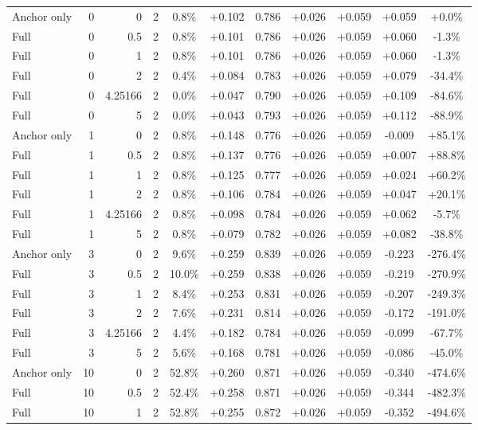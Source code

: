 \begin{table}[htbp]
\begin{tabular}{lrrrccccccc}
Anchor only & 0 & 0 & 2 & 0.8\% & +0.102 & 0.786 & +0.026 & +0.059 & +0.059 & +0.0\% \\
Full & 0 & 0.5 & 2 & 0.8\% & +0.101 & 0.786 & +0.026 & +0.059 & +0.060 & -1.3\% \\
Full & 0 & 1 & 2 & 0.8\% & +0.101 & 0.786 & +0.026 & +0.059 & +0.060 & -1.3\% \\
Full & 0 & 2 & 2 & 0.4\% & +0.084 & 0.783 & +0.026 & +0.059 & +0.079 & -34.4\% \\
Full & 0 & 4.25166 & 2 & 0.0\% & +0.047 & 0.790 & +0.026 & +0.059 & +0.109 & -84.6\% \\
Full & 0 & 5 & 2 & 0.0\% & +0.043 & 0.793 & +0.026 & +0.059 & +0.112 & -88.9\% \\
Anchor only & 1 & 0 & 2 & 0.8\% & +0.148 & 0.776 & +0.026 & +0.059 & -0.009 & +85.1\% \\
Full & 1 & 0.5 & 2 & 0.8\% & +0.137 & 0.776 & +0.026 & +0.059 & +0.007 & +88.8\% \\
Full & 1 & 1 & 2 & 0.8\% & +0.125 & 0.777 & +0.026 & +0.059 & +0.024 & +60.2\% \\
Full & 1 & 2 & 2 & 0.8\% & +0.106 & 0.784 & +0.026 & +0.059 & +0.047 & +20.1\% \\
Full & 1 & 4.25166 & 2 & 0.8\% & +0.098 & 0.784 & +0.026 & +0.059 & +0.062 & -5.7\% \\
Full & 1 & 5 & 2 & 0.8\% & +0.079 & 0.782 & +0.026 & +0.059 & +0.082 & -38.8\% \\
Anchor only & 3 & 0 & 2 & 9.6\% & +0.259 & 0.839 & +0.026 & +0.059 & -0.223 & -276.4\% \\
Full & 3 & 0.5 & 2 & 10.0\% & +0.259 & 0.838 & +0.026 & +0.059 & -0.219 & -270.9\% \\
Full & 3 & 1 & 2 & 8.4\% & +0.253 & 0.831 & +0.026 & +0.059 & -0.207 & -249.3\% \\
Full & 3 & 2 & 2 & 7.6\% & +0.231 & 0.814 & +0.026 & +0.059 & -0.172 & -191.0\% \\
Full & 3 & 4.25166 & 2 & 4.4\% & +0.182 & 0.784 & +0.026 & +0.059 & -0.099 & -67.7\% \\
Full & 3 & 5 & 2 & 5.6\% & +0.168 & 0.781 & +0.026 & +0.059 & -0.086 & -45.0\% \\
Anchor only & 10 & 0 & 2 & 52.8\% & +0.260 & 0.871 & +0.026 & +0.059 & -0.340 & -474.6\% \\
Full & 10 & 0.5 & 2 & 52.4\% & +0.258 & 0.871 & +0.026 & +0.059 & -0.344 & -482.3\% \\
Full & 10 & 1 & 2 & 52.8\% & +0.255 & 0.872 & +0.026 & +0.059 & -0.352 & -494.6\% \\

\end{tabular}
\end{table}
